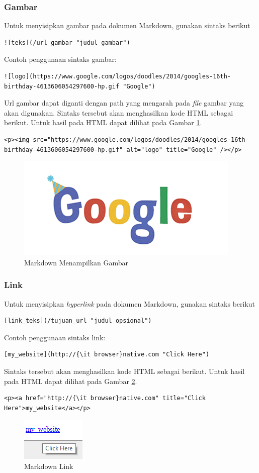 \subsubsection{Gambar}
Untuk menyisipkan gambar pada dokumen Markdown, gunakan sintaks berikut
\begin{lstlisting}
![teks](/url_gambar "judul_gambar")
\end{lstlisting}
Contoh penggunaan sintaks gambar: 
\begin{lstlisting}
![logo](https://www.google.com/logos/doodles/2014/googles-16th-birthday-4613606054297600-hp.gif "Google")
\end{lstlisting}
Url gambar dapat diganti dengan path yang mengarah pada {\it file} gambar yang akan
digunakan. Sintaks tersebut akan menghasilkan kode HTML sebagai berikut. Untuk
hasil pada HTML dapat dilihat pada Gambar \ref{fig:gambar}.
\begin{lstlisting}
<p><img src="https://www.google.com/logos/doodles/2014/googles-16th-birthday-4613606054297600-hp.gif" alt="logo" title="Google" /></p>
\end{lstlisting}
\begin{figure}[H]
\centering
\includegraphics[scale=1]{Gambar/gambar.png}
\caption[Markdown Menampilkan Gambar]{Markdown Menampilkan Gambar}
\label{fig:gambar}
\end{figure}

\subsubsection{Link}
Untuk menyisipkan {\it hyperlink} pada dokumen Markdown, gunakan sintaks berikut 
\begin{lstlisting}
[link_teks](/tujuan_url "judul opsional")
\end{lstlisting}
Contoh penggunaan sintaks link:
\begin{lstlisting}
[my_website](http://{\it browser}native.com "Click Here")
\end{lstlisting}
Sintaks tersebut akan menghasilkan kode HTML sebagai berikut. Untuk
hasil pada HTML dapat dilihat pada Gambar \ref{fig:ml}.
\begin{lstlisting}
<p><a href="http://{\it browser}native.com" title="Click Here">my_website</a></p>
\end{lstlisting}
\begin{figure}[H]
\centering
\includegraphics[scale=1]{Gambar/ml.png}
\caption[Markdown Link]{Markdown Link}
\label{fig:ml}
\end{figure}

